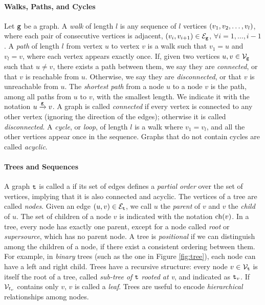 \paragraph{Walks, Paths, and Cycles}
Let $\mathtt{g}$ be a graph. A \emph{walk} of length $l$ is any sequence of $l$ vertices $\left( v_1, v_2, \ldots, v_l \right)$, where each pair of consecutive vertices is adjacent, \ie $\Par{v_i, v_{i+1}} \in \Edges{g}$, $\forall i= 1, \ldots, i-1$. A \emph{path} of length $l$ from vertex $u$ to vertex $v$ is a walk such that $v_1 = u$ and $v_l = v$, where each vertex appears exactly once. If, given two vertices $u, v \in \Nodes{g}$ such that $u \neq v$, there exists a path between them, we say they are \emph{connected}, or that $v$ is reachable from $u$. Otherwise, we say they are \emph{disconnected}, or that $v$ is unreachable from $u$. The \emph{shortest path} from a node $u$ to a node $v$ is the path, among all paths from $u$ to $v$, with the smallest length. We indicate it with the notation $u \xrightarrow[]{\mathtt{g}} v$. A graph is called \emph{connected} if every vertex is connected to any other vertex (ignoring the direction of the edges); otherwise it is called \emph{disconnected}. A \emph{cycle}, or \emph{loop}, of length $l$ is a walk where $v_1 = v_l$, and all the other vertices appear once in the sequence. Graphs that do not contain cycles are called \emph{acyclic}.

\paragraph{Trees and Sequences}
A graph $\mathtt{t}$ is called a  if its set of edges defines a \emph{partial order} over the set of vertices, implying that it is also connected and acyclic. The vertices of a tree are called \emph{nodes}. Given an edge $(u, v) \in \Edges{t}$, we call $u$ the \emph{parent} of $v$ and $v$ the \emph{child} of $u$. The set of children of a node $v$ is indicated with the notation $\mathrm{ch}(v)$. In a tree, every node has exactly one parent, except for a node called \emph{root} or \emph{supersource}, which has no parent node. A tree is \emph{positional} if we can distinguish among the children of a node, \ie if there exist a consistent ordering between them. For example, in \emph{binary} trees (such as the one in Figure \ref{fig:tree}), each node can have a left and right child. Trees have a recursive structure: every node $v \in \Nodes{t}$ is itself the root of a tree, called \emph{sub-tree of} $\mathtt{t}$ \emph{rooted at v}, and indicated as $\mathtt{t}_v$. If $\Nodes{\Tree{t}_v}$ contains only $v$, $v$ is called a \emph{leaf}. Trees are useful to encode \emph{hierarchical} relationships among nodes.


